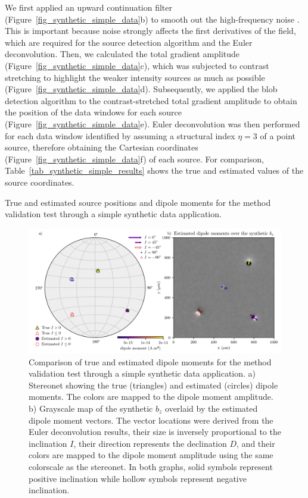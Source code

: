 We first applied an upward continuation filter (Figure~\ref{fig_synthetic_simple_data}b) to smooth out the high-frequency noise \citep{Blakely1996}.
This is important because noise strongly affects the first derivatives of the field, which are required for the source detection algorithm and the Euler deconvolution.
Then, we calculated the total gradient amplitude (Figure~\ref{fig_synthetic_simple_data}c), which was subjected to contrast stretching to highlight the weaker intensity sources as much as possible (Figure~\ref{fig_synthetic_simple_data}d).
Subsequently, we applied the blob detection algorithm to the contrast-stretched total gradient amplitude to obtain the position of the data windows for each source (Figure~\ref{fig_synthetic_simple_data}e).
Euler deconvolution was then performed for each data window identified by assuming a structural index $\eta = 3$ of a point source, therefore obtaining the Cartesian coordinates (Figure~\ref{fig_synthetic_simple_data}f) of each source. For comparison, Table~\ref{tab_synthetic_simple_results} shows the true and estimated values of the source coordinates.

\begin{table}[tb!]
  \begin{center}
    \small
    
  \end{center}
  \caption{
    True and estimated source positions and dipole moments for the method validation test through a simple synthetic data application.
  }
  \label{tab_synthetic_simple_results}
\end{table}

\begin{figure}[tb!]
  \centering
  \includegraphics[width=\linewidth]{figures/simple-synthetic-dipole-moment.png}
  \caption{
    Comparison of true and estimated dipole moments for the method validation test through a simple synthetic data application.
    a) Stereonet showing the true (triangles) and estimated (circles) dipole moments.
    The colors are mapped to the dipole moment amplitude.
    b) Grayscale map of the synthetic $b_z$ overlaid by the estimated dipole moment vectors.
    The vector locations were derived from the Euler deconvolution results, their size is inversely proportional to the inclination $I$, their direction represents the declination $D$, and their colors are mapped to the dipole moment amplitude using the same colorscale as the stereonet.
    In both graphs, solid symbols represent positive inclination while hollow symbols represent negative inclination.
  }
  \label{fig_synthetic_simple_results}
\end{figure}

